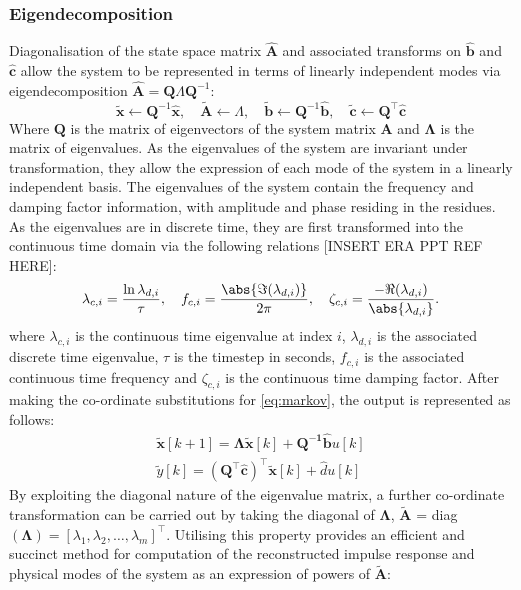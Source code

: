 \subsubsection{Eigendecomposition}
\label{sec:eigendecomposition}
Diagonalisation of the state space matrix $\hat{\mathbf{A}}$ and associated transforms on $\hat{\mathbf{b}}$ and $\hat{\mathbf{c}}$ allow the system to be represented in terms of linearly independent modes via eigendecomposition $\hat{\mathbf{A}} = \mathbf{Q} \Lambda \mathbf{Q}^{-1}$:
\begin{equation}
\label{eq:coord}
    \tilde{\mathbf{x}}       \leftarrow \mathbf{Q}^{-1}\mathbf{\hat{x}},
    \quad \tilde{\mathbf{A}} \leftarrow \Lambda,
    \quad \tilde{\mathbf{b}} \leftarrow \mathbf{Q}^{-1} \hat{\mathbf{b}},
    \quad \tilde{\mathbf{c}} \leftarrow \mathbf{Q}^{\top} \hat{\mathbf{c}}
\end{equation}
Where $\mathbf{Q}$ is the matrix of eigenvectors of the system matrix $\mathbf{A}$ and $\mathbf{\Lambda}$ is the matrix of eigenvalues. As the eigenvalues of the system are invariant under transformation, they allow the expression of each mode of the system in a linearly independent basis.
The eigenvalues of the system contain the frequency and damping factor information, with amplitude and phase residing in the residues. As the eigenvalues are in discrete time, they are first transformed into the continuous time domain via the following relations [INSERT ERA PPT REF HERE]:
\begin{equation}
    \lambda_{c,i} = \frac{\ln \lambda_{d,i}}{\tau}, \quad 
    f_{c,i} = \frac{\abs{\Im(\lambda_{d,i})}}{2\pi}, \quad 
    \zeta_{c,i} = \frac{-\Re(\lambda_{d,i})}{\abs{\lambda_{d,i}}}.
\end{equation}
where $\lambda_{c,i}$ is the continuous time eigenvalue at index $i$, $\lambda_{d,i}$ is the associated discrete time eigenvalue, $\tau$ is the timestep in seconds, $f_{c,i}$ is the associated continuous time frequency and $\zeta_{c,i}$ is the continuous time damping factor.
After making the co-ordinate substitutions for \eqref{eq:markov}, the output is represented as follows:
\begin{align}
\label{eq:markov-eig}
    \mathbf{\tilde{x}}[k + 1] = \mathbf{\Lambda} \mathbf{ \tilde{x}}[k] + \mathbf{Q^{-1} \hat{b}}u[k]\\
    \tilde{y}[k] = \left( \mathbf{Q}^{\top} \hat{\mathbf{c}} \right)^{\top} \tilde{\mathbf{x}}[k] + \hat{d}u[k]
\end{align}
By exploiting the diagonal nature of the eigenvalue matrix, a further co-ordinate transformation can be carried out by taking the diagonal of $\mathbf{\Lambda}$, $\tilde{\mathbf{A}}$ = diag$(\mathbf{\Lambda}) = [\lambda_1, \lambda_2, \dots, \lambda_m]^{\top}$. Utilising this property provides an efficient and succinct method for computation of the reconstructed impulse response and physical modes of the system as an expression of powers of $\tilde{\mathbf{A}}$:
